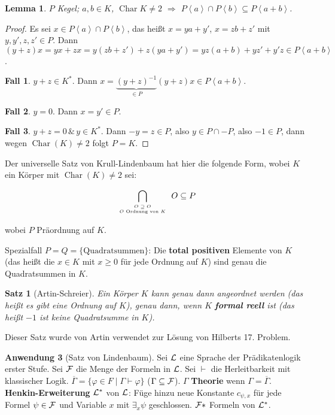 \documentclass[headsepline=true,DIV=11]{scrartcl}
\newtheorem*{theorem}{Satz}
\newtheorem*{lemma}{Lemma}
\theoremstyle{definition}
\renewcommand{\bar}[1]{\overline{#1}}
\newcommand{\Char}{\operatorname{Char}}
\begin{document}
\begin{lemma}
  $P$ Kegel; $a,b\in K$, $\Char K\neq 2$ $\Rightarrow$ $P\left<a\right>\cap P\left<b\right>\subseteq P\left<a+b\right>$.
\end{lemma}

\begin{proof}
  Es sei $x\in P\left<a\right>\cap P\left<b\right>$, das heißt $x=ya+y'$, $x=zb+z'$ mit $y,y',z,z'\in P$. Dann
  $(y+z)x=yx+zx=y(zb+z')+z(ya+y')=yz(a+b)+yz'+y'z\in P\left<a+b\right>$.

  {\bf Fall 1}. $y+z\in K^*$. Dann $x=\underbrace{(y+z)^{-1}}_{\in P}(y+z)x\in P\left<a+b\right>$.

  {\bf Fall 2}. $y=0$. Dann $x=y'\in P$.

  {\bf Fall 3}. $y+z=0\,\&\,y\in K^*$. Dann $-y=z\in P$, also $y\in P\cap -P$, also $-1\in P$, dann wegen $\Char(K)\neq 2$ folgt $P=K$.
\end{proof}

Der universelle Satz von Krull-Lindenbaum hat hier die folgende Form, wobei $K$ ein Körper mit $\Char(K)\neq 2$ sei:

$$ \bigcap\limits_{\tiny \begin{array}{c}{O\supseteq O} \\ {O\mbox{ Ordnung von } K}\end{array}} O \subseteq P $$

wobei $P$ Präordnung auf $K$.

Spezialfall $P=Q=\{\mbox{Quadratsummen}\}$: Die {\bf total positiven} Elemente von $K$ (das heißt die $x\in K$ mit $x\ge 0$ für jede Ordnung auf $K$)
sind genau die Quadratsummen in $K$.

\begin{theorem}[Artin-Schreier]
  Ein Körper $K$ kann genau dann angeordnet werden (das heißt es gibt eine Ordnung auf $K$), genau dann, wenn $K$ {\bf formal reell} ist (das heißt
  $-1$ ist keine Quadratsumme in $K$).
\end{theorem}

Dieser Satz wurde von Artin verwendet zur Lösung von Hilberts 17. Problem.

{\bf Anwendung 3} (Satz von Lindenbaum). Sei $\cal L$ eine Sprache der Prädikatenlogik erster Stufe. Sei $\cal F$ die Menge der Formeln in $\cal
L$. Sei $\vdash$ die Herleitbarkeit mit klassischer Logik. $\bar{\Gamma} = \{\varphi\in F\mid \Gamma\vdash\varphi\}$ ($\Gamma\subseteq {\cal
  F}$). $\Gamma$ {\bf Theorie} wenn $\Gamma=\bar{\Gamma}$. {\bf Henkin-Erweiterung} ${\cal L}^*$ von $\cal L$: Füge hinzu neue Konstante $c_{\psi,x}$
für jede Formel $\psi\in {\cal F}$ und Variable $x$ mit $\exists_x\psi$ geschlossen. ${\cal F}*$ Formeln von ${\cal L}^*$.
\end{document}
